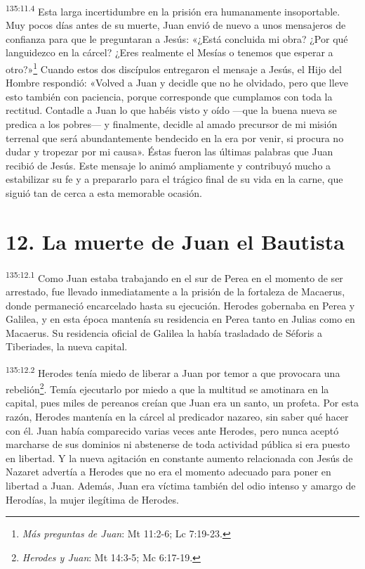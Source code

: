\par 
\textsuperscript{135:11.4} Esta larga incertidumbre en la prisión era humanamente insoportable. Muy pocos días antes de su muerte, Juan envió de nuevo a unos mensajeros de confianza para que le preguntaran a Jesús: «¿Está concluida mi obra? ¿Por qué languidezco en la cárcel? ¿Eres realmente el Mesías o tenemos que esperar a otro?»\footnote{\textit{Más preguntas de Juan}: Mt 11:2-6; Lc 7:19-23.} Cuando estos dos discípulos entregaron el mensaje a Jesús, el Hijo del Hombre respondió: «Volved a Juan y decidle que no he olvidado, pero que lleve esto también con paciencia, porque corresponde que cumplamos con toda la rectitud. Contadle a Juan lo que habéis visto y oído ---que la buena nueva se predica a los pobres--- y finalmente, decidle al amado precursor de mi misión terrenal que será abundantemente bendecido en la era por venir, si procura no dudar y tropezar por mi causa». Éstas fueron las últimas palabras que Juan recibió de Jesús. Este mensaje lo animó ampliamente y contribuyó mucho a estabilizar su fe y a prepararlo para el trágico final de su vida en la carne, que siguió tan de cerca a esta memorable ocasión.

\section*{12. La muerte de Juan el Bautista}
\par 
\textsuperscript{135:12.1} Como Juan estaba trabajando en el sur de Perea en el momento de ser arrestado, fue llevado inmediatamente a la prisión de la fortaleza de Macaerus, donde permaneció encarcelado hasta su ejecución. Herodes gobernaba en Perea y Galilea, y en esta época mantenía su residencia en Perea tanto en Julias como en Macaerus. Su residencia oficial de Galilea la había trasladado de Séforis a Tiberiades, la nueva capital.

\par 
\textsuperscript{135:12.2} Herodes tenía miedo de liberar a Juan por temor a que provocara una rebelión\footnote{\textit{Herodes y Juan}: Mt 14:3-5; Mc 6:17-19.}. Temía ejecutarlo por miedo a que la multitud se amotinara en la capital, pues miles de pereanos creían que Juan era un santo, un profeta. Por esta razón, Herodes mantenía en la cárcel al predicador nazareo, sin saber qué hacer con él. Juan había comparecido varias veces ante Herodes, pero nunca aceptó marcharse de sus dominios ni abstenerse de toda actividad pública si era puesto en libertad. Y la nueva agitación en constante aumento relacionada con Jesús de Nazaret advertía a Herodes que no era el momento adecuado para poner en libertad a Juan. Además, Juan era víctima también del odio intenso y amargo de Herodías, la mujer ilegítima de Herodes.

